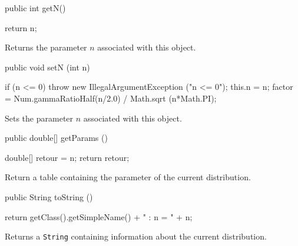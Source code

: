 \begin{htmlonly}
\end{htmlonly}
\begin{code}

   public int getN()\begin{hide} {
      return n;
   }\end{hide}
\end{code}
  \begin{tabb} Returns the parameter $n$ associated with this object.
  \end{tabb}
\begin{code}

   public void setN (int n)\begin{hide} {
     if (n <= 0)
        throw new IllegalArgumentException ("n <= 0");
      this.n = n;
      factor = Num.gammaRatioHalf(n/2.0) / Math.sqrt (n*Math.PI);
   }\end{hide}
\end{code}
  \begin{tabb} Sets the parameter $n$ associated with this object.
  \end{tabb}
\begin{code}

   public double[] getParams ()\begin{hide} {
      double[] retour = {n};
      return retour;
   }\end{hide}
\end{code}
\begin{tabb}
   Return a table containing the parameter of the current distribution.
\end{tabb}
\begin{hide}\begin{code}

   public String toString ()\begin{hide} {
      return getClass().getSimpleName() + " : n = " + n;
   }\end{hide}
\end{code}
\begin{tabb}
   Returns a \texttt{String} containing information about the current distribution.
\end{tabb}\end{hide}
\begin{code}\begin{hide}
}\end{hide}
\end{code}
